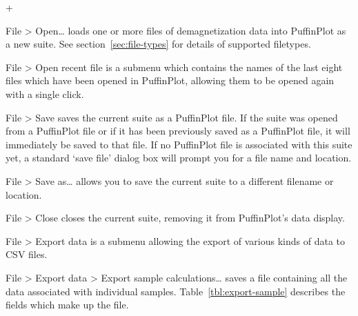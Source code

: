 \documentclass[a4paper,british]{article}
\newcommand{\menuitemlabel}[1]{%
\mbox{\textsf{#1}}\hfil}
\newenvironment{menuitemlist}%
{\begin{list}{}{%
\renewcommand{\makelabel}{\menuitemlabel}%
\setlength{\labelwidth}{35pt}%
\setlength{\leftmargin}%
             {\labelwidth+\labelsep}}}%
{\end{list}}
\newcommand{\caps}[1]{\MakeTextUppercase{#1}} %
\newcommand{\submenu}{ \textgreater{} } %
\begin{document}
\begin{menuitemlist}

\item[File\submenu Open\ldots] loads one or more files of demagnetization
  data into PuffinPlot as a new suite. See
  section~\ref{sec:file-types} for details of supported filetypes.

\item[File\submenu Open recent file] is a submenu which
contains the names of the last eight files which have been opened in
PuffinPlot, allowing them to be opened again with a single click.

\item[File\submenu Save] saves the current suite as a PuffinPlot file. If
the suite was opened from a PuffinPlot file or if it has been previously
saved as a PuffinPlot file, it will immediately be saved to that file. If no
PuffinPlot file is associated with this suite yet, a standard ‘save file’
dialog box will prompt you for a file name and location.

\item[File\submenu Save as\ldots] allows you to save the current suite to a
different filename or location.

\item[File\submenu Close] closes the current suite, removing it from
PuffinPlot's data display.

\item[File\submenu Export data] is a submenu allowing the export of
various kinds of data to \caps{csv} files.

\item[File\submenu Export data\submenu Export sample calculations\ldots]
  saves a file containing all the data associated with individual samples.
  Table~\ref{tbl:export-sample} describes the fields which make up the file.


\end{menuitemlist}
\end{document}
